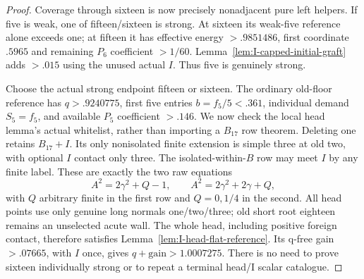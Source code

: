 \begin{proof}
Coverage through sixteen is now precisely nonadjacent pure left
helpers. If five is weak, one of fifteen/sixteen is strong.
At sixteen its weak-five reference alone exceeds one; at fifteen
it has effective energy $>.9851486$, first coordinate $.5965$
and remaining $P_6$ coefficient $>1/60$.
Lemma~\ref{lem:I-capped-initial-graft} adds $>.015$ using
the unused actual $I$. Thus five is genuinely strong.

Choose the actual strong endpoint fifteen or sixteen.
The ordinary old-floor reference has $q>.9240775$, first
five entries $b=f_5/5<.361$, individual demand $S_5=f_5$,
and available $P_5$ coefficient $>.146$.
We now check the local head lemma's actual whitelist, rather
than importing a $B_{17}$ row theorem. Deleting one retains
$B_{17}+I$. Its only nonisolated finite extension is simple
three at old two, with optional $I$ contact only three.
The isolated-within-$B$ row may meet $I$ by any finite label.
These are exactly the two raw equations
\[
 A^2=2\gamma^2+Q-1,\qquad
 A^2=2\gamma^2+2\gamma+Q,
\]
with $Q$ arbitrary finite in the first row and $Q=0,1/4$ in
the second. All head points use only genuine long normals
one/two/three; old short root eighteen remains an unselected
acute wall. The whole head, including positive foreign contact,
therefore satisfies Lemma~\ref{lem:I-head-flat-reference}.
Its q-free gain $>.07665$, with $I$ once, gives
$q+\text{gain}>1.0007275$.
There is no need to prove sixteen individually strong or to
repeat a terminal head/I scalar catalogue.
\end{proof}

